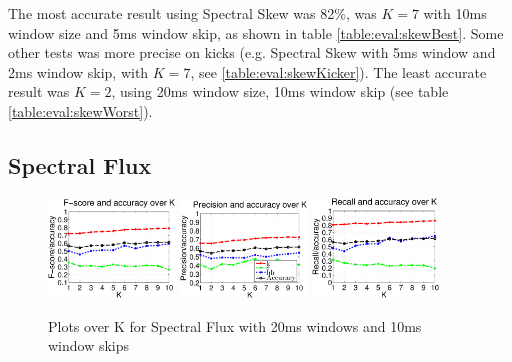 		The most accurate result using Spectral Skew was 82\%, was $K=7$ with 10ms window size and 5ms window skip, as shown in table \ref{table:eval:skewBest}. Some other tests was more precise on kicks (e.g. Spectral Skew with 5ms window and 2ms window skip, with $K=7$, see \ref{table:eval:skewKicker}). The least accurate result was $K=2$, using 20ms window size, 10ms window skip (see table \ref{table:eval:skewWorst}).
	
	\subsection{Spectral Flux}
		
		\begin{figure}
		
		
			\centering\includegraphics[width=0.3\textwidth]{tex/appendices/test/sflux2010FP.png}
			\centering\includegraphics[width=0.3\textwidth]{tex/appendices/test/sflux2010_P.png}
			\centering\includegraphics[width=0.3\textwidth]{tex/appendices/test/sflux2010_R.png}
			
			\caption{Plots over K for Spectral Flux with 20ms windows and 10ms window skips}
		\end{figure}
